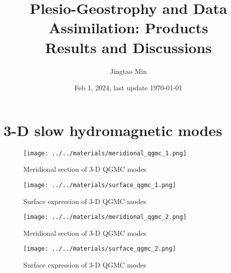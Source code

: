 \documentclass[a4paper, 11pt]{report}
\title{Plesio-Geostrophy and Data Assimilation: Products \\ {\Large Results and Discussions}}
\author{Jingtao Min}
\date{Feb 1, 2024, last update \today}
\begin{document}
\maketitle



\appendix

\chapter{3-D slow hydromagnetic modes}

\begin{figure}[htbp]
    \centering
    \texttt{[image: ../../materials/meridional\_qgmc\_1.png]}
    \caption{Meridional section of 3-D QGMC modes}
\end{figure}

\begin{figure}[htbp]
    \centering
    \texttt{[image: ../../materials/surface\_qgmc\_1.png]}
    \caption{Surface expression of 3-D QGMC modes}
\end{figure}

\begin{figure}[htbp]
    \centering
    \texttt{[image: ../../materials/meridional\_qgmc\_2.png]}
    \caption{Meridional section of 3-D QGMC modes}
\end{figure}

\begin{figure}[htbp]
    \centering
    \texttt{[image: ../../materials/surface\_qgmc\_2.png]}
    \caption{Surface expression of 3-D QGMC modes}
\end{figure}


\printbibliography
\end{document}
